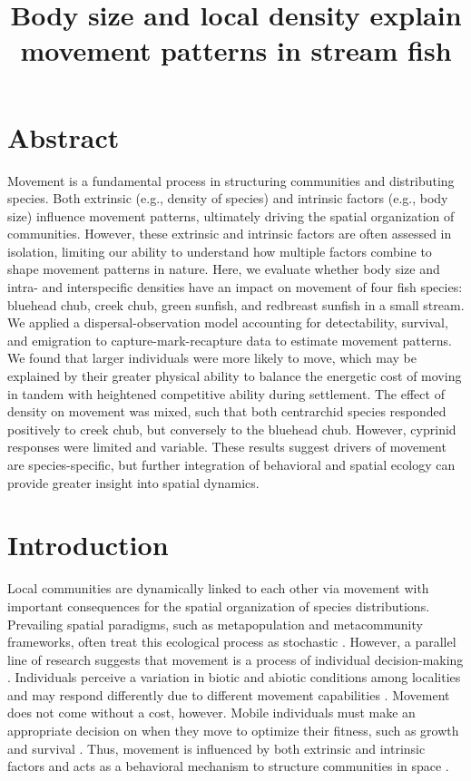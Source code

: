 \documentclass[11pt, class=article, crop=false]{standalone}
\title{Body size and local density explain movement patterns in stream fish}
\date{} %
\author{} %
\begin{document}
\maketitle

\section{Abstract}

Movement is a fundamental process in structuring communities and distributing species. Both extrinsic (e.g., density of species) and intrinsic factors (e.g., body size) influence movement patterns, ultimately driving the spatial organization of communities. However, these extrinsic and intrinsic factors are often assessed in isolation, limiting our ability to understand how multiple factors combine to shape movement patterns in nature. Here, we evaluate whether body size and intra- and interspecific densities have an impact on movement of four fish species: bluehead chub, creek chub, green sunfish, and redbreast sunfish in a small stream. We applied a dispersal-observation model accounting for detectability, survival, and emigration to capture-mark-recapture data to estimate movement patterns. We found that larger individuals were more likely to move, which may be explained by their greater physical ability to balance the energetic cost of moving in tandem with heightened competitive ability during settlement. The effect of density on movement was mixed, such that both centrarchid species responded positively to creek chub, but conversely to the bluehead chub. However, cyprinid responses were limited and variable. These results suggest drivers of movement are species-specific, but further integration of behavioral and spatial ecology can provide greater insight into spatial dynamics. 

\section{Introduction}

Local communities are dynamically linked to each other via movement with important consequences for the spatial organization of species distributions. Prevailing spatial paradigms, such as metapopulation and metacommunity frameworks, often treat this ecological process as stochastic \citep{thompsonProcessbasedMetacommunityFramework2020}. However, a parallel line of research suggests that movement is a process of individual decision-making \citep{clobertDispersalEcologyEvolution2012}. Individuals perceive a variation in biotic and abiotic conditions among localities and may respond differently due to different movement capabilities \citep{clobertDispersalEcologyEvolution2012}. Movement does not come without a cost, however. Mobile individuals must make an appropriate decision on when they move to optimize their fitness, such as growth and survival \citep{bonteCostsDispersal2012}. Thus, movement is influenced by both extrinsic and intrinsic factors and acts as a behavioral mechanism to structure communities in space \citep{leiboldMetacommunityConceptFramework2004, mcpeekEvolutionPassiveDispersal2024, schlagelMovementmediatedCommunityAssembly2020}. 
\end{document}
